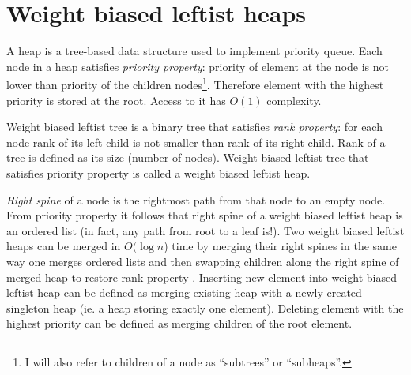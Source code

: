 \section{Weight biased leftist heaps}\label{sec:wblh}

A heap is a tree-based data structure used to implement priority queue. Each node in a heap satisfies \textit{priority property}: priority of element at the node is not lower than priority of the children nodes\footnote{I will also refer to children of a node as ``subtrees'' or ``subheaps''.}. Therefore element with the highest priority is stored at the root. Access to it has $O(1)$ complexity.

Weight biased leftist tree \cite{ChoSah96} is a binary tree that satisfies \textit{rank property}: for each node rank of its left child is not smaller than rank of its right child. Rank of a tree is defined as its size (number of nodes). Weight biased leftist tree that satisfies priority property is called a weight biased leftist heap.

\textit{Right spine} of a node is the rightmost path from that node to an empty node. From priority property it follows that right spine of a weight biased leftist heap is an ordered list (in fact, any path from root to a leaf is!). Two weight biased leftist heaps can be merged in $O(\log n$) time by merging their right spines in the same way one merges ordered lists and then swapping children along the right spine of merged heap to restore rank property \cite{Oka99}. Inserting new element into weight biased leftist heap can be defined as merging existing heap with a newly created singleton heap (ie. a heap storing exactly one element). Deleting element with the highest priority can be defined as merging children of the root element.